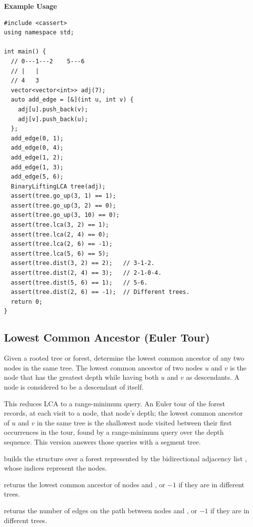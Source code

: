 \textbf{Example Usage}\par
\begin{lstlisting}[style=cpp]
#include <cassert>
using namespace std;

int main() {
  // 0---1---2    5---6
  // |   |
  // 4   3
  vector<vector<int>> adj(7);
  auto add_edge = [&](int u, int v) {
    adj[u].push_back(v);
    adj[v].push_back(u);
  };
  add_edge(0, 1);
  add_edge(0, 4);
  add_edge(1, 2);
  add_edge(1, 3);
  add_edge(5, 6);
  BinaryLiftingLCA tree(adj);
  assert(tree.go_up(3, 1) == 1);
  assert(tree.go_up(3, 2) == 0);
  assert(tree.go_up(3, 10) == 0);
  assert(tree.lca(3, 2) == 1);
  assert(tree.lca(2, 4) == 0);
  assert(tree.lca(2, 6) == -1);
  assert(tree.lca(5, 6) == 5);
  assert(tree.dist(3, 2) == 2);   // 3-1-2.
  assert(tree.dist(2, 4) == 3);   // 2-1-0-4.
  assert(tree.dist(5, 6) == 1);   // 5-6.
  assert(tree.dist(2, 6) == -1);  // Different trees.
  return 0;
}
\end{lstlisting}
\subsection{Lowest Common Ancestor (Euler Tour)}
\label{sec:2.8.5}
Given a rooted tree or forest, determine the lowest common ancestor of any two nodes in the same tree. The lowest common ancestor of two nodes $u$ and $v$ is the node that has the greatest depth while having both $u$ and $v$ as descendants. A node is considered to be a descendant of itself.

This reduces LCA to a range-minimum query. An Euler tour of the forest records, at each visit to a node, that node's depth; the lowest common ancestor of $u$ and $v$ in the same tree is the shallowest node visited between their first occurrences in the tour, found by a range-minimum query over the depth sequence. This version answers those queries with a segment tree.

\begin{compactitem}
  \item {} builds the structure over a forest represented by the bidirectional adjacency list , whose indices represent the nodes.
  \item {} returns the lowest common ancestor of nodes  and , or $-1$ if they are in different trees.
  \item {} returns the number of edges on the path between nodes  and , or $-1$ if they are in different trees.
\end{compactitem}

